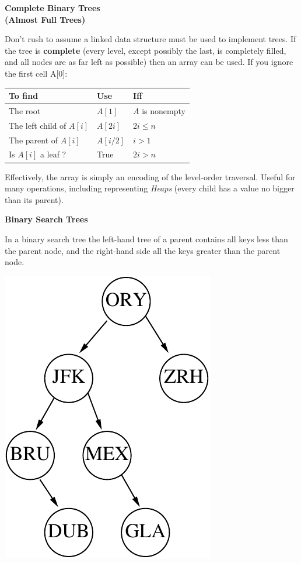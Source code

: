 \documentclass[a4,portraitt]{slides}
\begin{document}
\newpage
{\samepage
\begin{center}
{\Large{\bf Complete Binary Trees\\[1.75ex]{\small(Almost Full Trees)}}}
\end{center}
Don't rush to assume a linked data structure must be used to implement
trees. If the tree is {\bf complete} (every level, except possibly the last, is completely filled, and all nodes are as far left as possible)
then an array can be used. If you ignore the first cell A[0]:

\begin{center}
\begin{tabular}{|l|l|l|}\hline
To find & Use & Iff\\ \hline
The root & $A[1]$ & $A$ is nonempty \\
The left child of $A[i]$ & $A[2i]$ & $2i \leq n$ \\
The parent of $A[i]$ & $A[i/2]$ & $i > 1$\\
Is $A[i]$ a leaf ? & True & $2i > n$\\ \hline
\end{tabular}
\end{center}

Effectively, the array is simply an encoding of the level-order traversal.
Useful for many operations, including representing {\it Heaps} (every child has a value no bigger than its parent).
}


\newpage
{\samepage
\begin{center}
{\Large{\bf Binary Search Trees}}
\end{center}
In a binary search tree the left-hand tree of a parent contains all keys less than the parent node,
and the right-hand side all the keys greater than the parent node.
\begin{center}
\includegraphics{../Images/treeapt.pdf}
\end{center}
}
\end{document}
